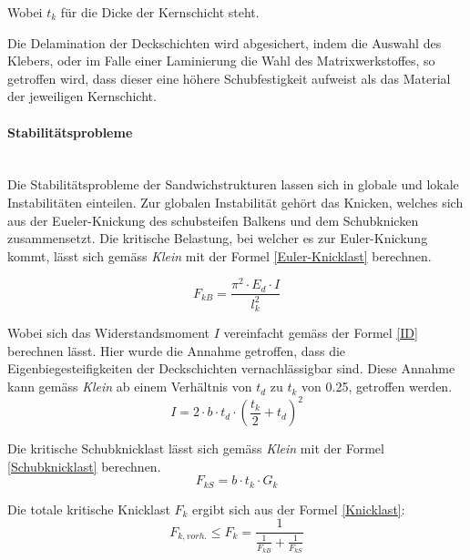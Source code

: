     Wobei $t_k$ für die Dicke der Kernschicht steht.

    Die Delamination der Deckschichten wird abgesichert, indem die Auswahl des Klebers, oder im Falle einer Laminierung die Wahl des Matrixwerkstoffes, so getroffen wird, dass dieser eine höhere Schubfestigkeit aufweist als das Material der jeweiligen Kernschicht.

    \paragraph{Stabilitätsprobleme}\mbox{}\\
    Die Stabilitätsprobleme der Sandwichstrukturen lassen sich in globale und lokale Instabilitäten einteilen. Zur globalen Instabilität gehört das Knicken, welches sich aus der Eueler-Knickung des schubsteifen Balkens und dem Schubknicken zusammensetzt. Die kritische Belastung, bei welcher es zur Euler-Knickung kommt, lässt sich gemäss \emph{Klein} \cite{klein} mit der Formel \ref{Euler-Knicklast} berechnen.

    \begin{equation}
      \label{Euler-Knicklast}
      F_{kB}=\frac{\pi^2 \cdot E_d \cdot I}{l_k^{2}}
    \end{equation}

    Wobei sich das Widerstandsmoment $I$ vereinfacht gemäss der Formel \ref{ID} berechnen lässt. Hier wurde die Annahme getroffen, dass die Eigenbiegesteifigkeiten der Deckschichten vernachlässigbar sind. Diese Annahme kann gemäss \emph{Klein} ab einem Verhältnis von $t_d$ zu $t_k$ von 0.25, getroffen werden.
    \begin{equation}
      \label{ID}
      I= 2 \cdot b \cdot t_d \cdot \left( \frac{t_k}{2} + t_d \right )^{2}
    \end{equation}

    Die kritische Schubknicklast lässt sich gemäss \emph{Klein} mit der Formel \ref{Schubknicklast} berechnen.
    \begin{equation}
      \label{Schubknicklast}
      F_{kS} = b \cdot t_k \cdot G_k
    \end{equation}

    Die totale kritische Knicklast \(F_k\) ergibt sich aus der Formel \ref{Knicklast}:
    \begin{equation}
      \label{Knicklast}
      F_{k, vorh.} \leq F_k=\frac{1}{\frac{1}{F_{kB}}+\frac{1}{F_{kS}}}
    \end{equation}

